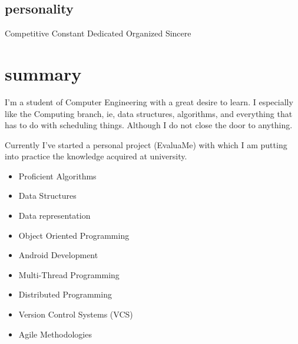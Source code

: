 \documentclass[]{friggeri-cv} %
\begin{document}
\begin{aside}
    \section{personality}
        Competitive\quad{\color{blue} $\varheartsuit\varheartsuit\varheartsuit\varheartsuit\varheartsuit$}{\color{black} $\varheartsuit$}
        Constant\quad{\color{blue} $\varheartsuit$}{\color{black} $\varheartsuit\varheartsuit\varheartsuit\varheartsuit\varheartsuit$}
        Dedicated\quad{\color{blue} $\varheartsuit\varheartsuit\varheartsuit\varheartsuit$}{\color{black} $\varheartsuit\varheartsuit$}
        Organized\quad{\color{blue} $\varheartsuit\varheartsuit\varheartsuit$}{\color{black} $\varheartsuit\varheartsuit\varheartsuit$}
        Sincere\quad{\color{blue} $\varheartsuit\varheartsuit\varheartsuit$}{\color{black} $\varheartsuit\varheartsuit$}
\end{aside}




\section{summary}



I'm a student of Computer Engineering with a great desire to learn. I especially like the Computing branch, ie, data structures, algorithms, and everything that has to do with scheduling things. Although I do not close the door to anything.

Currently I've started a personal project (EvaluaMe) with which I am putting into practice the knowledge acquired at university.

\noindent\begin{minipage}[t]{0.5\linewidth}
    \begin{itemize}
    	\item{Proficient Algorithms}
	\item{Data Structures}
    	\item{Data representation}
    	\item{Object Oriented Programming}
    	\item{Android Development}

    \end{itemize}
    \end{minipage}%
    \begin{minipage}[t]{0.5\linewidth}
    \begin{itemize}
    	\item{Multi-Thread Programming}
    	\item{Distributed Programming}
   	\item{Version Control Systems (VCS)}
   	\item{Agile Methodologies}
    \end{itemize}
\end{minipage}\par\bigskip
\end{document}
